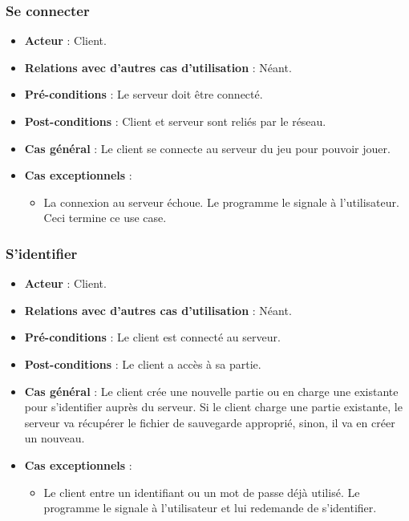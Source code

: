 \documentclass[a4paper,titlepage]{scrreprt}
\begin{document}
    \subsubsection{Se connecter}
      \begin{itemize}
        \item \textbf{Acteur} : Client.
        \item \textbf{Relations avec d'autres cas d'utilisation}  : Néant.
        \item \textbf{Pré-conditions} : Le serveur doit être connecté.
        \item \textbf{Post-conditions} : Client et serveur sont reliés par le réseau.
        \item \textbf{Cas général} : Le client se connecte au serveur du jeu pour pouvoir jouer. 
        \item \textbf{Cas exceptionnels} : 
        \begin{itemize}
            \item La connexion au serveur échoue. Le programme le signale à l'utilisateur. Ceci termine ce use case.
          \end{itemize}
      \end{itemize}
    \subsubsection{S'identifier}
      \begin{itemize}
        \item \textbf{Acteur} : Client.
        \item \textbf{Relations avec d'autres cas d'utilisation}  : Néant.
        \item \textbf{Pré-conditions} : Le client est connecté au serveur.
        \item \textbf{Post-conditions} : Le client a accès à sa partie.
        \item \textbf{Cas général} : Le client crée une nouvelle \gls{partie} ou en charge une existante pour s’identifier auprès du serveur. Si le client charge une partie existante, le serveur va récupérer le fichier de sauvegarde approprié, sinon, il va en créer un nouveau.
        \item \textbf{Cas exceptionnels} : 
         \begin{itemize}
            \item Le client entre un identifiant ou un mot de passe déjà utilisé. Le programme le signale à l'utilisateur et lui redemande de s'identifier.
          \end{itemize}
      \end{itemize}
\end{document}
